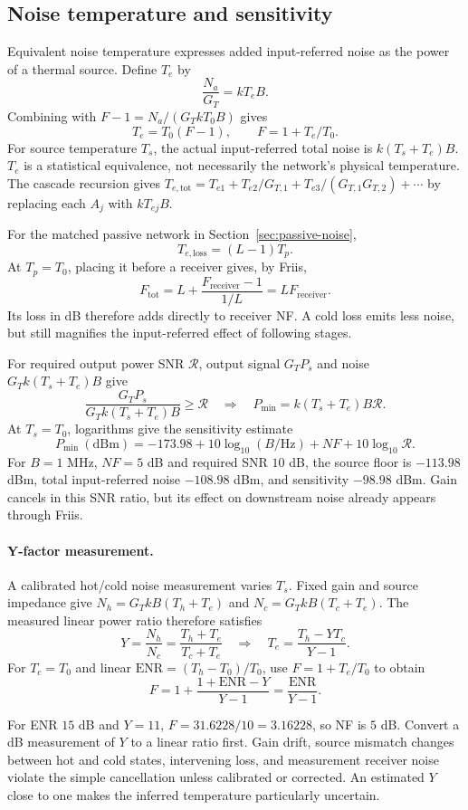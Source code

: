 \subsection{Noise temperature and sensitivity}
Equivalent noise temperature expresses added input-referred noise as the power of a thermal source. Define $T_e$ by
\[
\frac{N_a}{G_T}=kT_eB.
\]
Combining with $F-1=N_a/(G_TkT_0B)$ gives
\[
T_e=T_0(F-1),\qquad F=1+T_e/T_0.
\]
For source temperature $T_s$, the actual input-referred total noise is $k(T_s+T_e)B$. $T_e$ is a statistical equivalence, not necessarily the network's physical temperature. The cascade recursion gives
$T_{e,\mathrm{tot}}=T_{e1}+T_{e2}/G_{T,1}+T_{e3}/(G_{T,1}G_{T,2})+\cdots$ by replacing each $A_j$ with $kT_{ej}B$.

For the matched passive network in Section~\ref{sec:passive-noise},
\[
T_{e,\mathrm{loss}}=(L-1)T_p.
\]
At $T_p=T_0$, placing it before a receiver gives, by Friis,
\[
F_{\mathrm{tot}}=L+\frac{F_{\mathrm{receiver}}-1}{1/L}
=L F_{\mathrm{receiver}}.
\]
Its loss in dB therefore adds directly to receiver NF. A cold loss emits less noise, but still magnifies the input-referred effect of following stages.

For required output power SNR $\mathcal R$, output signal $G_TP_s$ and noise $G_Tk(T_s+T_e)B$ give
\[
\frac{G_TP_s}{G_Tk(T_s+T_e)B}\geq\mathcal R
\quad\Longrightarrow\quad P_{\min}=k(T_s+T_e)B\mathcal R.
\]
At $T_s=T_0$, logarithms give the sensitivity estimate
\[
P_{\min}\ (\mathrm{dBm})=-173.98+10\log_{10}(B/\mathrm{Hz})+NF+10\log_{10}\mathcal R.
\]
For $B=1$ MHz, $NF=5$ dB and required SNR $10$ dB, the source floor is $-113.98$ dBm, total input-referred noise $-108.98$ dBm, and sensitivity $-98.98$ dBm. Gain cancels in this SNR ratio, but its effect on downstream noise already appears through Friis.

\paragraph{Y-factor measurement.}
A calibrated hot/cold noise measurement varies $T_s$. Fixed gain and source impedance give
$N_h=G_TkB(T_h+T_e)$ and $N_c=G_TkB(T_c+T_e)$. The measured linear power ratio therefore satisfies
\[
Y=\frac{N_h}{N_c}=\frac{T_h+T_e}{T_c+T_e}
\quad\Longrightarrow\quad
T_e=\frac{T_h-YT_c}{Y-1}.
\]
For $T_c=T_0$ and linear $\mathrm{ENR}=(T_h-T_0)/T_0$, use $F=1+T_e/T_0$ to obtain
\[
F=1+\frac{1+\mathrm{ENR}-Y}{Y-1}
=\frac{\mathrm{ENR}}{Y-1}.
\]

For ENR $15$ dB and $Y=11$, $F=31.6228/10=3.16228$, so NF is $5$ dB. Convert a dB measurement of $Y$ to a linear ratio first. Gain drift, source mismatch changes between hot and cold states, intervening loss, and measurement receiver noise violate the simple cancellation unless calibrated or corrected. An estimated $Y$ close to one makes the inferred temperature particularly uncertain.


